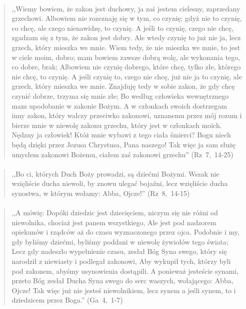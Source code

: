\documentclass[10pt,a4paper,oneside]{article}
\begin{document}
\paragraph{}
\begin{quote}
,,Wiemy bowiem, że zakon jest duchowy, ja zaś jestem cielesny, zaprzedany grzechowi. Albowiem nie rozeznaję się w tym, co czynię; gdyż nie to czynię, co chcę, ale czego nienawidzę, to czynię. A jeśli to czynię, czego nie chcę, zgadzam się z tym, że zakon jest dobry. Ale wtedy czynię to już nie ja, lecz grzech, który mieszka we mnie. Wiem tedy, że nie mieszka we mnie, to jest w ciele moim, dobro; mam bowiem zawsze dobrą wolę, ale wykonania tego, co dobre, brak; Albowiem nie czynię dobrego, które chcę, tylko złe, którego nie chcę, to czynię. A jeśli czynię to, czego nie chcę, już nie ja to czynię, ale grzech, który mieszka we mnie. Znajduję tedy w sobie zakon, że gdy chcę czynić dobrze, trzyma się mnie złe; Bo według człowieka wewnętrznego mam upodobanie w zakonie Bożym. A w członkach swoich dostrzegam inny zakon, który walczy przeciwko zakonowi, uznanemu przez mój rozum i bierze mnie w niewolę zakonu grzechu, który jest w członkach moich. Nędzny ja człowiek! Któż mnie wybawi z tego ciała śmierci? Bogu niech będą dzięki przez Jezusa Chrystusa, Pana naszego! Tak więc ja sam służę umysłem zakonowi Bożemu, ciałem zaś zakonowi grzechu'' \mbox{(Rz 7, 14-25)}
\end{quote}
\paragraph{}
\begin{quote}
,,Bo ci, których Duch Boży prowadzi, są dziećmi Bożymi. Wszak nie wzięliście ducha niewoli, by znowu ulegać bojaźni, lecz wzięliście ducha synostwa, w którym wołamy: Abba, Ojcze!'' \mbox{(Rz 8, 14-15)}
\end{quote}
\paragraph{}
\begin{quote}
,,A mówię: Dopóki dziedzic jest dziecięciem, niczym się nie różni od niewolnika, chociaż jest panem wszystkiego, Ale jest pod nadzorem opiekunów i rządców aż do czasu wyznaczonego przez ojca. Podobnie i my, gdy byliśmy dziećmi, byliśmy poddani w niewolę żywiołów tego świata; Lecz gdy nadeszło wypełnienie czasu, zesłał Bóg Syna swego, który się narodził z niewiasty i podlegał zakonowi, Aby wykupił tych, którzy byli pod zakonem, abyśmy usynowienia dostąpili. A ponieważ jesteście synami, przeto Bóg zesłał Ducha Syna swego do serc waszych, wołającego: Abba, Ojcze! Tak więc już nie jesteś niewolnikiem, lecz synem a jeśli synem, to i dziedzicem przez Boga.'' \mbox{(Ga 4, 1-7)}
\end{quote}
\end{document}
